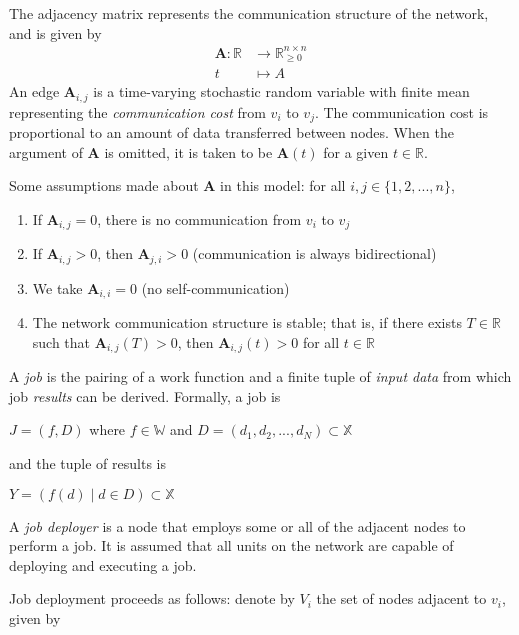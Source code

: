 \documentclass[../mthe-493-project-proposal.tex]{subfiles}
\begin{document}
    The adjacency matrix represents the communication structure of the network, and is given by
    \begin{align*}
        \mathbf{A} \colon \mathbb{R} &\to \mathbb{R}^{n \times n}_{\geq 0} \\
        t                            &\mapsto A
    \end{align*}
    An edge $\mathbf{A}_{i,j}$ is a time-varying stochastic random variable with finite mean representing the \textit{communication cost} from $v_i$ to $v_j$. The communication cost is proportional to an amount of data transferred between nodes. When the argument of $\mathbf{A}$ is omitted, it is taken to be $\mathbf{A}(t)$ for a given $t \in \mathbb{R}$.

    Some assumptions made about $\mathbf{A}$ in this model: for all $i, j \in \{1, 2, ..., n\}$,

    \begin{enumerate}
        \item If $\mathbf{A}_{i,j} = 0$, there is no communication from $v_i$ to $v_j$
        \item If $\mathbf{A}_{i,j} > 0$, then $\mathbf{A}_{j,i} > 0$ (communication is always bidirectional)
        \item We take $\mathbf{A}_{i,i} = 0$ (no self-communication)
        \item The network communication structure is stable; that is, if there exists $T \in \mathbb{R}$ such that $\mathbf{A}_{i,j}(T) > 0$, then $\mathbf{A}_{i,j}(t) > 0$ for all $t \in \mathbb{R}$
    \end{enumerate}

    A \textit{job} is the pairing of a work function and a finite tuple of \textit{input data} from which job \textit{results} can be derived. Formally, a job is \\

    \centerline{\(J = (f, D)\) where \(f \in \mathbb{W}\) and \(D = (d_1, d_2, ..., d_N) \subset \mathbb{X}\)}

    and the tuple of results is

    \centerline{\(Y = (f(d) \mid d \in D ) \subset \mathbb{X}\)}

    A \textit{job deployer} is a node that employs some or all of the adjacent nodes to perform a job. It is assumed that all units on the network are capable of deploying and executing a job.

    Job deployment proceeds as follows: denote by $V_i$ the set of nodes adjacent to $v_i$, given by
\end{document}
